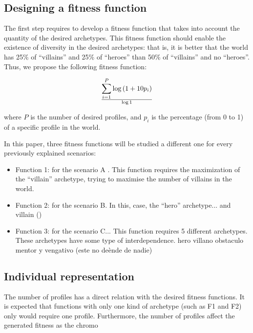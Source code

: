\documentclass[runningheads,a4paper]{llncs}
\begin{document}
\subsection{Designing a fitness function}

The first step requires to develop a fitness function that takes into
account the quantity of the desired archetypes. This fitness function
should enable the existence of diversity in the desired
archetypes: that is, it is better that the world has 25\% of
``villains'' and 25\% of ``heroes'' than 50\% of ``villains'' and no
``heroes''. Thus, we propose the following fitness function: 

\begin{equation}
\sum _{i=1}^{P} {\log \left( 1+10p_{i}\right) } \over {\log 1}
\end{equation}

where $P$ is the number of desired profiles, and $p_{i}$ is the
percentage (from 0 to 1) of a specific profile in the world. %

In this paper, three fitness functions will be studied a different one
for every previously explained scenarios:
\begin{itemize}
\item Function 1: for the scenario A . This function requires the maximization of the ``villain'' archetype, trying to maximise the number of villains in the world. 
\item Function 2: for the scenario B. In this, case, the ``hero'' archetype... and villain ()
\item Function 3: for the scenario C... This function requires 5 different archetypes. These archetypes have some type of interdependence. hero villano obstaculo mentor y vengativo (este no deènde de nadie)
\end{itemize}

\subsection{Individual representation}

The number of profiles has a direct relation with the desired fitness functions. It is expected that functions with only one kind of archetype (such as F1 and F2) only would require one profile. Furthermore, the number of profiles affect the generated fitness as the chromo
\end{document}
